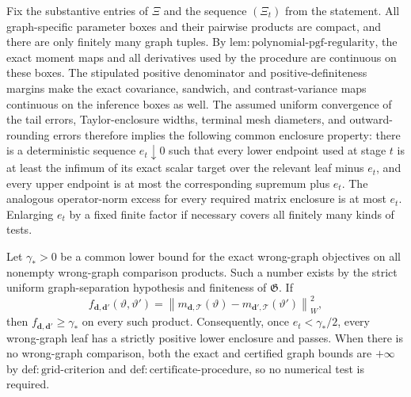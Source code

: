 Fix the substantive entries of \(\Xi\) and the sequence \((\Xi_t)\) from the statement.  All graph-specific parameter boxes and their pairwise products are compact, and there are only finitely many graph tuples.  By \(\mathrm{lem{:}polynomial\text{-}pgf\text{-}regularity}\), the exact moment maps and all derivatives used by the procedure are continuous on these boxes.  The stipulated positive denominator and positive-definiteness margins make the exact covariance, sandwich, and contrast-variance maps continuous on the inference boxes as well.  The assumed uniform convergence of the tail errors, Taylor-enclosure widths, terminal mesh diameters, and outward-rounding errors therefore implies the following common enclosure property: there is a deterministic sequence \(e_t\downarrow0\) such that every lower endpoint used at stage \(t\) is at least the infimum of its exact scalar target over the relevant leaf minus \(e_t\), and every upper endpoint is at most the corresponding supremum plus \(e_t\).  The analogous operator-norm excess for every required matrix enclosure is at most \(e_t\).  Enlarging \(e_t\) by a fixed finite factor if necessary covers all finitely many kinds of tests.

Let \(\gamma_*>0\) be a common lower bound for the exact wrong-graph objectives on all nonempty wrong-graph comparison products.  Such a number exists by the strict uniform graph-separation hypothesis and finiteness of \(\mathfrak G\).  If
\[
 f_{\boldsymbol d,\boldsymbol d'}(\vartheta,\vartheta')
 =\left\lVert m_{\boldsymbol d,\mathcal T}(\vartheta)
        -m_{\boldsymbol d',\mathcal T}(\vartheta')\right\rVert_W^2,
\]
then \(f_{\boldsymbol d,\boldsymbol d'}\geq\gamma_*\) on every such product.  Consequently, once \(e_t<\gamma_*/2\), every wrong-graph leaf has a strictly positive lower enclosure and passes.  When there is no wrong-graph comparison, both the exact and certified graph bounds are \(+\infty\) by \(\mathrm{def{:}grid\text{-}criterion}\) and \(\mathrm{def{:}certificate\text{-}procedure}\), so no numerical test is required.

